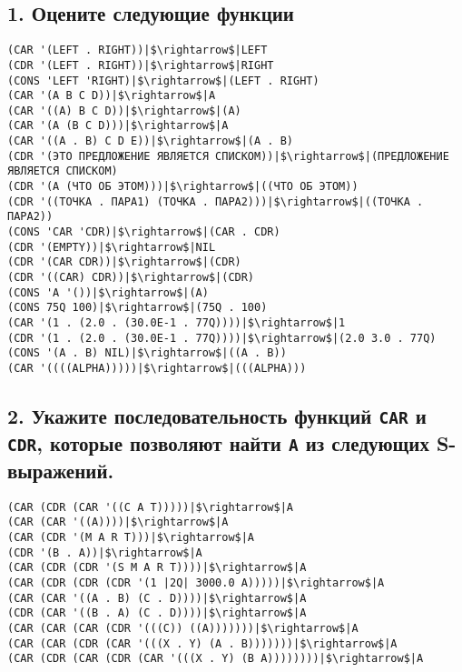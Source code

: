 \documentclass{amsart}
\begin{document}
\subsection{1. Оцените следующие функции}

\begin{verbatim}
(CAR '(LEFT . RIGHT))|$\rightarrow$|LEFT
(CDR '(LEFT . RIGHT))|$\rightarrow$|RIGHT
(CONS 'LEFT 'RIGHT)|$\rightarrow$|(LEFT . RIGHT)
(CAR '(A B C D))|$\rightarrow$|A
(CAR '((A) B C D))|$\rightarrow$|(A)
(CAR '(A (B C D)))|$\rightarrow$|A
(CAR '((A . B) C D E))|$\rightarrow$|(A . B)
(CDR '(ЭТО ПРЕДЛОЖЕНИЕ ЯВЛЯЕТСЯ СПИСКОМ))|$\rightarrow$|(ПРЕДЛОЖЕНИЕ ЯВЛЯЕТСЯ СПИСКОМ)
(CDR '(А (ЧТО ОБ ЭТОМ)))|$\rightarrow$|((ЧТО ОБ ЭТОМ))
(CDR '((ТОЧКА . ПАРА1) (ТОЧКА . ПАРА2)))|$\rightarrow$|((ТОЧКА . ПАРА2))
(CONS 'CAR 'CDR)|$\rightarrow$|(CAR . CDR)
(CDR '(EMPTY))|$\rightarrow$|NIL
(CDR '(CAR CDR))|$\rightarrow$|(CDR)
(CDR '((CAR) CDR))|$\rightarrow$|(CDR)
(CONS 'A '())|$\rightarrow$|(A)
(CONS 75Q 100)|$\rightarrow$|(75Q . 100)
(CAR '(1 . (2.0 . (30.0E-1 . 77Q))))|$\rightarrow$|1
(CDR '(1 . (2.0 . (30.0E-1 . 77Q))))|$\rightarrow$|(2.0 3.0 . 77Q)
(CONS '(A . B) NIL)|$\rightarrow$|((A . B))
(CAR '((((ALPHA)))))|$\rightarrow$|(((ALPHA)))
\end{verbatim}

\subsection{2. Укажите последовательность функций \texttt{CAR} и \texttt{CDR}, которые позволяют найти \texttt{A} из следующих S-выражений.}

\begin{verbatim}
(CAR (CDR (CAR '((C A T)))))|$\rightarrow$|A
(CAR (CAR '((A))))|$\rightarrow$|A
(CAR (CDR '(M A R T)))|$\rightarrow$|A
(CDR '(B . A))|$\rightarrow$|A
(CAR (CDR (CDR '(S M A R T))))|$\rightarrow$|A
(CAR (CDR (CDR (CDR '(1 |2Q| 3000.0 A)))))|$\rightarrow$|A
(CAR (CAR '((A . B) (C . D))))|$\rightarrow$|A
(CDR (CAR '((B . A) (C . D))))|$\rightarrow$|A
(CAR (CAR (CAR (CDR '(((C)) ((A)))))))|$\rightarrow$|A
(CAR (CAR (CDR (CAR '(((X . Y) (A . B)))))))|$\rightarrow$|A
(CAR (CDR (CAR (CDR (CAR '(((X . Y) (B A))))))))|$\rightarrow$|A
\end{verbatim}
\end{document}

